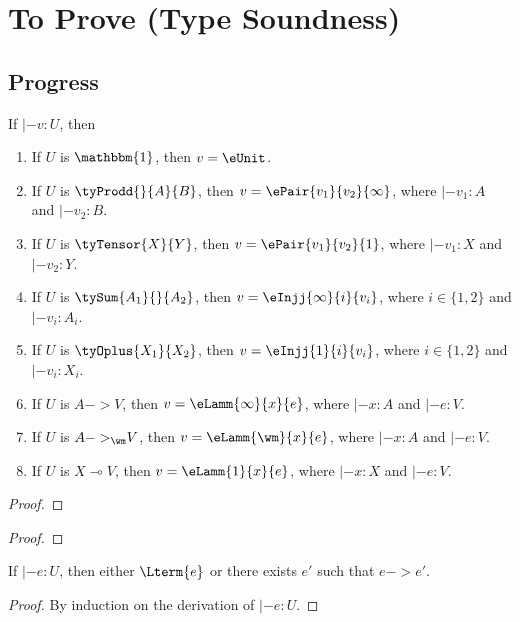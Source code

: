 \section{To Prove (Type Soundness)}

\subsection{Progress}

\begin{lemma}
  If $|- v : U$, then
  \begin{enumerate}[leftmargin=*]
  \item If $U$ is $\mathbbm{1}$, then $v = \eUnit$.
  \item If $U$ is $\tyProdd{}{A}{B}$, then $v = \ePair{v_1}{v_2}{\infty}$, where
    $|- v_1 : A$ and $|- v_2 : B$.
  \item If $U$ is $\tyTensor{X}{Y}$, then $v = \ePair{v_1}{v_2}{1}$, where
    $|- v_1 : X$ and $|- v_2 : Y$.
  \item If $U$ is $\tySum{A_1}{}{A_2}$, then $v =
    \eInjj{\infty}{i}{v_i}$, where $i \in \{1, 2\}$ and $|- v_i : A_i$.
  \item If $U$ is $\tyOplus{X_1}{X_2}$, then $v =
    \eInjj{1}{i}{v_i}$, where $i \in \{1, 2\}$ and $|- v_i : X_i$.    
  \item If $U$ is $A -> V$, then $v = \eLamm{\infty}{x}{e}$, where $|- x
    : A$ and $|- e : V$.
  \item If $U$ is $A {->}_{\wm} V$, then $v = \eLamm{\wm}{x}{e}$, where $|- x :
    A$ and $|- e : V$.
  \item If $U$ is $X \multimap V$, then $v = \eLamm{1}{x}{e}$, where $|- x : X$ and $|-
    e : V$.
  \end{enumerate}
  \begin{proof}
    \todo{}
  \end{proof}
\end{lemma}

\begin{lemma}
  \todo{}
  \begin{proof}
    \todo{}
  \end{proof}
\end{lemma}

\begin{theorem}
  If $|- e : U$, then either $\Lterm{e}$ or there exists $e'$ such that $e ->
  e'$.
  \begin{proof}
    By induction on the derivation of $|- e : U$.
  \end{proof}
\end{theorem}


